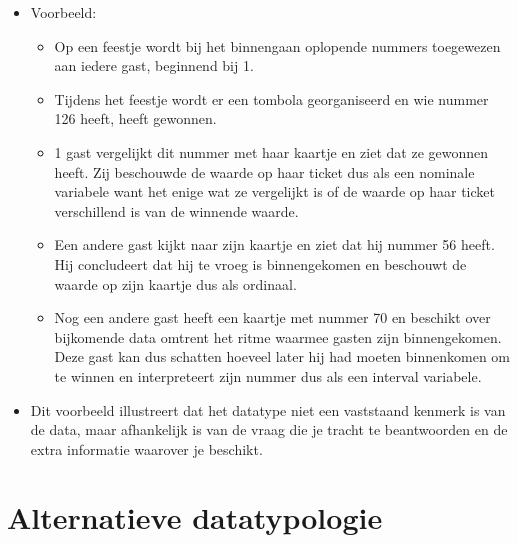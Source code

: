 \documentclass[]{memoir}
\providecommand{\tightlist}{%
  \setlength{\itemsep}{0pt}\setlength{\parskip}{0pt}}
\begin{document}
\begin{itemize}
\tightlist
\item
  Voorbeeld:

  \begin{itemize}
  \tightlist
  \item
    Op een feestje wordt bij het binnengaan oplopende nummers toegewezen aan iedere gast, beginnend bij 1.
  \item
    Tijdens het feestje wordt er een tombola georganiseerd en wie nummer 126 heeft, heeft gewonnen.
  \item
    1 gast vergelijkt dit nummer met haar kaartje en ziet dat ze gewonnen heeft. Zij beschouwde de waarde op haar ticket dus als een nominale variabele want het enige wat ze vergelijkt is of de waarde op haar ticket verschillend is van de winnende waarde.
  \item
    Een andere gast kijkt naar zijn kaartje en ziet dat hij nummer 56 heeft. Hij concludeert dat hij te vroeg is binnengekomen en beschouwt de waarde op zijn kaartje dus als ordinaal.
  \item
    Nog een andere gast heeft een kaartje met nummer 70 en beschikt over bijkomende data omtrent het ritme waarmee gasten zijn binnengekomen. Deze gast kan dus schatten hoeveel later hij had moeten binnenkomen om te winnen en interpreteert zijn nummer dus als een interval variabele.
  \end{itemize}
\item
  Dit voorbeeld illustreert dat het datatype niet een vaststaand kenmerk is van de data, maar afhankelijk is van de vraag die je tracht te beantwoorden en de extra informatie waarover je beschikt.
\end{itemize}

\hypertarget{alternatieve-datatypologie}{%
\section{Alternatieve datatypologie}\label{alternatieve-datatypologie}}
\end{document}
